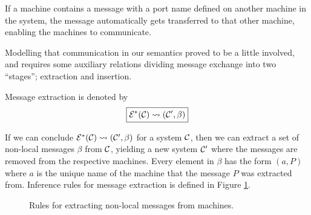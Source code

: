 If a machine contains a message with a port name defined on another machine in
the system, the message automatically gets transferred to that other machine,
enabling the machines to communicate.

Modelling that communication in our semantics proved to be a little involved,
and requires some auxiliary relations dividing message exchange into
two ``stages''; extraction and insertion.

Message extraction is denoted by
\begin{equation*}
\boxed{\mathcal{E}^*(\mathcal{C}) \leadsto (\mathcal{C}', \beta)}
\end{equation*}

If we can conclude $\mathcal{E}^*(\mathcal{C}) \leadsto (\mathcal{C}', \beta)$ for a system $\mathcal{C}$, then we
can extract a set of non-local messages $\beta$ from $\mathcal{C}$, yielding a new
system $\mathcal{C}'$ where the messages are removed from the respective machines. Every
element in $\beta$ has the form $(a, P)$ where $a$ is the unique name of the
machine that the message $P$ was extracted from. Inference rules for message
extraction is defined in Figure \ref{fig:rule:extract}.

\begin{figure}[!ht]
\caption{Rules for extracting non-local messages from machines.}\label{fig:rule:extract}
\end{figure}

